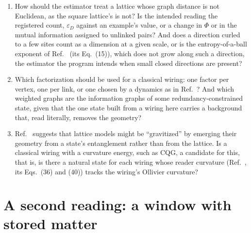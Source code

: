 \documentclass[aps,pre,10pt,twocolumn,superscriptaddress,nofootinbib]{revtex4-2}
\begin{document}
\begin{enumerate}
\item How should the estimator treat a lattice whose graph distance is not Euclidean, as the square lattice's is not?
Is the intended reading the registered count, $\varepsilon_D$ against an example's value, or a change in $\Phi$ or in
the mutual information assigned to unlinked pairs? And does a direction curled to a few sites count as a dimension at
a given scale, or is the entropy-of-a-ball exponent of Ref.~\cite{CCM16} (its Eq.~(15)), which does not grow along
such a direction, the estimator the program intends when small closed directions are present?
\item Which factorization should be used for a classical wiring: one factor per vertex, one per link, or one chosen
by a dynamics as in Ref.~\cite{CS20}? And which weighted graphs are the information graphs of some
redundancy-constrained state, given that the one state built from a wiring here carries a background that, read
literally, removes the geometry?
\item Ref.~\cite{CC17} suggests that lattice models might be ``gravitized'' by emerging their geometry from a state's
entanglement rather than from the lattice. Is a classical wiring with a curvature energy, such as CQG, a candidate
for this, that is, is there a natural state for each wiring whose reader curvature (Ref.~\cite{CCM16}, its Eqs.~(36)
and (40)) tracks the wiring's Ollivier curvature?
\end{enumerate}

\section{A second reading: a window with stored matter}
\label{sec:matter}
\end{document}
